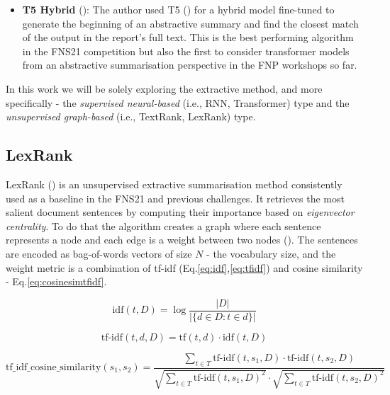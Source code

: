 \begin{itemize}
    \item \textbf{T5 Hybrid} (\cite{orzhenovskii-2021-t5}): The author used T5 (\cite{rayson2019t5}) for a hybrid model fine-tuned to generate the beginning of an abstractive summary and find the closest match of the output in the report’s full text.
    This is the best performing algorithm in the FNS21 competition but also the first to consider transformer models from an abstractive summarisation perspective in the FNP workshops so far.

\end{itemize}

In this work we will be solely exploring the extractive method, and more specifically - the \emph{supervised neural-based} (i.e., RNN, Transformer) type and the \emph{unsupervised graph-based} (i.e., TextRank, LexRank) type.


\subsection{LexRank}\label{subsec:lexrank}
LexRank (\cite{Erkan2004LexRankGC}) is an unsupervised extractive summarisation method consistently used as a baseline in the FNS21 and previous challenges.
It retrieves the most salient document sentences by computing their importance based on \emph{eigenvector centrality}.
To do that the algorithm creates a graph where each sentence represents a node and each edge is a weight between two nodes (\cite{Shearing2020AutomatedTS}).
The sentences are encoded as bag-of-words vectors of size $N$ - the vocabulary size, and the weight metric is a combination of tf-idf (Eq.\ref{eq:idf},\ref{eq:tfidf}) and cosine similarity - Eq.\ref{eq:cosinesimtfidf}.

\begin{equation}
    \text{idf}(t, D) = \log \frac{|D|}{|\{d \in D : t \in d\}|} \label{eq:idf}
\end{equation}

\begin{equation}
    \text{tf-idf}(t, d, D) = \text{tf}(t, d) \cdot \text{idf}(t, D)
    \label{eq:tfidf}
\end{equation}

\begin{equation}
    \text{tf\_idf\_cosine\_similarity}(s_1, s_2) = \frac{\sum_{t \in T} \text{tf-idf}(t, s_1, D) \cdot \text{tf-idf}(t, s_2, D)}{ \sqrt{\sum_{t \in T} \text{tf-idf}(t, s_1, D)^2} \cdot \sqrt{\sum_{t \in T} \text{tf-idf}(t, s_2, D)^2}}
    \label{eq:cosinesimtfidf}
\end{equation}

